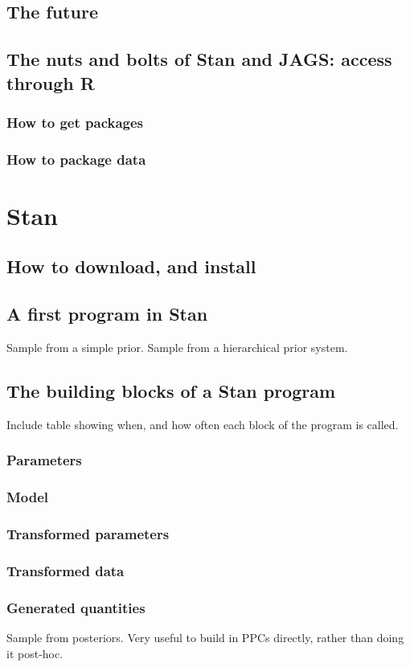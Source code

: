 \documentclass[11pt,fullpage]{book}
\begin{document}
\subsection{The future}

\subsection{The nuts and bolts of Stan and JAGS: access through R}
\subsubsection{How to get packages}
\subsubsection{How to package data}

\section{Stan}
\subsection{How to download, and install}
\subsection{A first program in Stan}
Sample from a simple prior. Sample from a hierarchical prior system.
\subsection{The building blocks of a Stan program}
Include table showing when, and how often each block of the program is called.
\subsubsection{Parameters}
\subsubsection{Model}
\subsubsection{Transformed parameters}
\subsubsection{Transformed data}
\subsubsection{Generated quantities}
Sample from posteriors. Very useful to build in PPCs directly, rather than doing it post-hoc.
\end{document}
